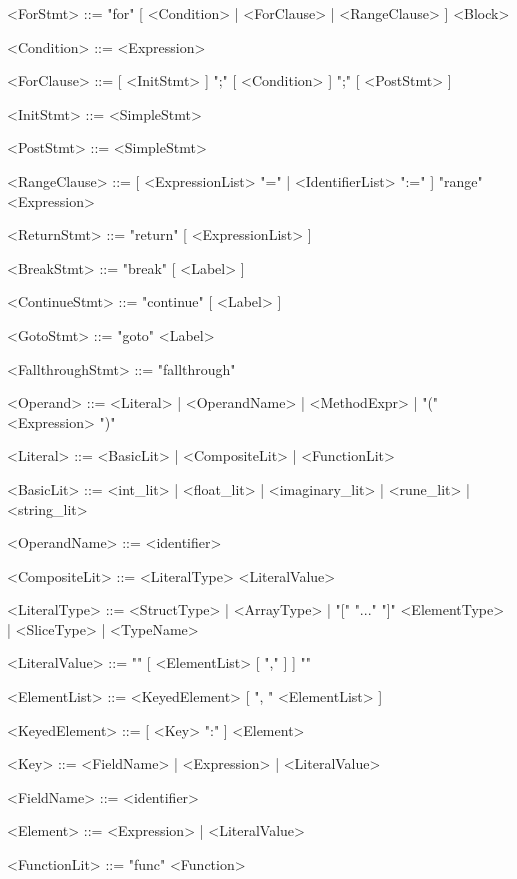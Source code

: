 \begin{grammar}
    <ForStmt>               ::=     "for" [ <Condition> | <ForClause> | <RangeClause> ] <Block>

    <Condition>             ::=     <Expression>

    <ForClause>             ::=     [ <InitStmt> ] ";" [ <Condition> ] ";" [ <PostStmt> ]

    <InitStmt>              ::=     <SimpleStmt>

    <PostStmt>              ::=     <SimpleStmt>

    <RangeClause>           ::=     [ <ExpressionList> "=" | <IdentifierList> ":=" ] "range" <Expression>

    <ReturnStmt>            ::=     "return" [ <ExpressionList> ]

    <BreakStmt>             ::=     "break" [ <Label> ]

    <ContinueStmt>          ::=     "continue" [ <Label> ]

    <GotoStmt>              ::=     "goto" <Label>

    <FallthroughStmt>       ::=     "fallthrough"

    <Operand>           ::= <Literal> | <OperandName> | <MethodExpr> | "(" <Expression> ")"

    <Literal>           ::= <BasicLit> | <CompositeLit> | <FunctionLit>

    <BasicLit>          ::= <int_lit> | <float_lit> | <imaginary_lit> | <rune_lit> | <string_lit>

    <OperandName>       ::= <identifier>

    <CompositeLit>      ::=     <LiteralType> <LiteralValue>

    <LiteralType>       ::=     <StructType> | <ArrayType> | "[" "..." "]" <ElementType>
                        |    <SliceType> | <TypeName>

    <LiteralValue>      ::=     "{" [ <ElementList> [ "," ] ] "}"

    <ElementList>       ::=     <KeyedElement> [ ", " <ElementList> ]

    <KeyedElement>      ::=     [ <Key> ":" ] <Element>

    <Key>               ::=     <FieldName> | <Expression> | <LiteralValue>

    <FieldName>         ::=     <identifier>

    <Element>           ::=     <Expression> | <LiteralValue>

    <FunctionLit>       ::= "func" <Function>


\end{grammar}

